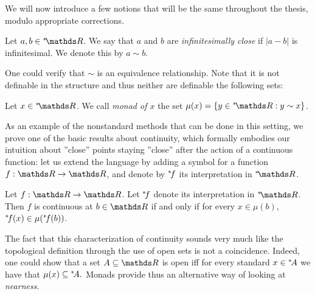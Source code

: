\documentclass[draft.tex]{subfiles}
\begin{document}
We will now introduce a few notions that will be the same throughout the thesis, modulo appropriate corrections.
\begin{definition}
\label{def:infclose}
Let $a, b \in \ns{\RR}$. We say that $a$ and $b$ are \emph{infinitesimally close} if $\vert a - b \vert$ is infinitesimal. We denote this by $a \sim b$.
\end{definition}
One could verify that $\sim$ is an equivalence relationship. Note that it is not definable in the structure and thus neither are definable the following sets:
\begin{definition}
\label{def:monad}
Let $x \in \ns{\RR}$. We call \emph{monad of $x$} the set $\mu(x) = \{y \in \ns{\RR}: y \sim x\}$. 
\end{definition}
As an example of the nonstandard methods that can be done in this setting, we prove one of the basic results about continuity, which formally embodies our intuition about ''close'' points staying ''close'' after the action of a continuous function: let us extend the language by adding a symbol for a function $f: \RR \to \RR$, and denote by ${{}^{*}\!{f}}$ its interpretation in $\ns{\RR}$.
\begin{theorem}
\label{thm:continuity}
Let $f: \RR \to \RR$. Let ${{}^{*}\!{f}}$ denote its interpretation in $\ns{\RR}$. Then $f$ is continuous at $b \in \RR$ if and only if for every $x \in \mu(b)$, ${{}^{*}\!{f}}(x) \in \mu({{}^{*}\!{f}}(b))$.
\end{theorem}
\begin{remark}
The fact that this characterization of continuity sounds very much like the topological definition through the use of open sets is not a coincidence. Indeed, one could show that a set $A \subseteq \RR$ is open iff for every standard $x \in {{}^{*}\!{A}}$ we have that $\mu(x) \subseteq {{}^{*}\!{A}}.$ Monads provide thus an alternative way of looking at \textit{nearness}.
\end{remark}
\end{document}

